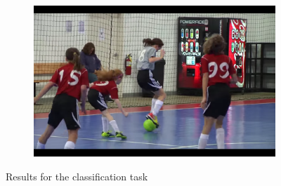 \begin{figure}[H]
\begin{subfigure}[b]{.4\textwidth}
  \texttt{}
\end{subfigure}%
\begin{subfigure}[b]{.6\textwidth}
  \centering
\includegraphics[width=0.95\linewidth]{img/results/activity_classification/results_visualization_classification_12}
\end{subfigure}

\caption{Results for the classification task}
\label{fig:results_visualization_classification_annex_2}
\end{figure}


